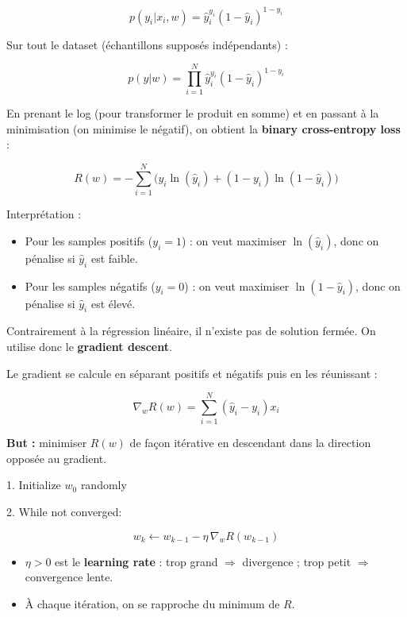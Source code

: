 \documentclass[11pt,a4paper,openany]{book}
\begin{document}
\[
p(y_i | x_i, w) = \hat{y}_i^{y_i} (1 - \hat{y}_i)^{1 - y_i}
\]

Sur tout le dataset (échantillons supposés indépendants) :

\[
p(y|w) = \prod_{i=1}^{N} \hat{y}_i^{y_i} (1 - \hat{y}_i)^{1 - y_i}
\]

\vspace{0.4cm}

En prenant le log (pour transformer le produit en somme) et en passant à la minimisation (on minimise le négatif), on obtient la \textbf{binary cross-entropy loss} :

\[
R(w) =
- \sum_{i=1}^{N} \Big( y_i \ln(\hat{y}_i) + (1 - y_i)\ln(1 - \hat{y}_i) \Big)
\]

\vspace{0.4cm}

Interprétation :
\begin{itemize}
    \item Pour les samples positifs ($y_i = 1$) : on veut maximiser $\ln(\hat{y}_i)$, donc on pénalise si $\hat{y}_i$ est faible.
    \item Pour les samples négatifs ($y_i = 0$) : on veut maximiser $\ln(1 - \hat{y}_i)$, donc on pénalise si $\hat{y}_i$ est élevé.
\end{itemize}

\vspace{0.4cm}

Contrairement à la régression linéaire, il n'existe pas de solution fermée. On utilise donc le \textbf{gradient descent}.

\vspace{0.6cm}

Le gradient se calcule en séparant positifs et négatifs puis en les réunissant :

\[
\nabla_w R(w)
=
\sum_{i=1}^{N} (\hat{y}_i - y_i)x_i
\]

\vspace{0.8cm}

\begin{algbox}[title=Gradient Descent Algorithm]
\textbf{But :} minimiser $R(w)$ de façon itérative en descendant dans la direction opposée au gradient.

\vspace{0.3cm}

1. Initialize $w_0$ randomly

2. While not converged:

\[
w_k \leftarrow w_{k-1} - \eta \, \nabla_w R(w_{k-1})
\]

\vspace{0.4cm}

\begin{itemize}
    \item $\eta > 0$ est le \textbf{learning rate} : trop grand $\Rightarrow$ divergence ; trop petit $\Rightarrow$ convergence lente.
    \item À chaque itération, on se rapproche du minimum de $R$.
\end{itemize}
\end{algbox}
\end{document}
